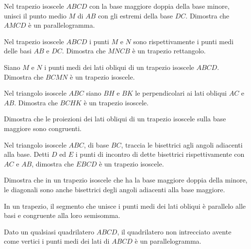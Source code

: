 \begin{multicols}{2}
\begin{esercizio}
\label{ese:4.28}
Nel trapezio isoscele $ABCD$ con la base maggiore doppia della base minore, unisci il punto medio $M$ di $AB$ con gli estremi della base $DC$. Dimostra che $AMCD$ è un parallelogramma.
\end{esercizio}

\begin{esercizio}
\label{ese:4.29}
Nel trapezio isoscele $ABCD$ i punti $M$ e $N$ sono rispettivamente i punti medi delle basi $AB$ e $DC$. Dimostra che $MNCB$ è un trapezio rettangolo.
\end{esercizio}

\begin{esercizio}
\label{ese:4.30}
Siano $M$ e $N$ i punti medi dei lati obliqui di un trapezio isoscele $ABCD$. Dimostra che $BCMN$ è un trapezio isoscele.
\end{esercizio}

\begin{esercizio}
\label{ese:4.31}
Nel triangolo isoscele $ABC$ siano $BH$ e $BK$ le perpendicolari ai lati obliqui $AC$ e $AB$. Dimostra che $BCHK$ è un trapezio isoscele.
\end{esercizio}

\begin{esercizio}
\label{ese:4.32}
Dimostra che le proiezioni dei lati obliqui di un trapezio isoscele sulla base maggiore sono congruenti.
\end{esercizio}

\begin{esercizio}
\label{ese:4.33}
Nel triangolo isoscele $ABC$, di base $BC$, traccia le bisettrici agli angoli adiacenti alla base. Detti $D$ ed $E$ i punti di incontro di dette bisettrici rispettivamente con $AC$ e $AB$, dimostra che $EBCD$ è un trapezio isoscele.
\end{esercizio}

\begin{esercizio}
\label{ese:4.34}
Dimostra che in un trapezio isoscele che ha la base maggiore doppia della minore, le diagonali sono anche bisettrici degli angoli adiacenti alla base maggiore.
\end{esercizio}

\begin{esercizio}
\label{ese:4.35}
In un trapezio, il segmento che unisce i punti medi dei lati obliqui è parallelo alle basi e congruente alla loro semisomma.
\end{esercizio}

\begin{esercizio}
\label{ese:4.36}
Dato un qualsiasi quadrilatero $ABCD$, il quadrilatero non intrecciato avente come vertici i punti medi dei lati di $ABCD$ è un parallelogramma.
\end{esercizio}


\end{multicols}
